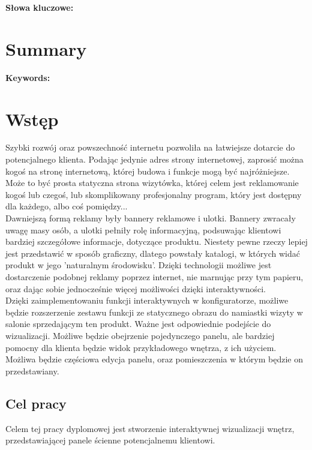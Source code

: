\documentclass{article} %
\begin{document}
\textbf{Słowa kluczowe:}

\section*{Summary}

\textbf{Keywords:}

\newpage

\tableofcontents

\newpage

\section{Wstęp}


Szybki rozwój oraz powszechność internetu pozwoliła na łatwiejsze dotarcie do potencjalnego klienta. Podając jedynie adres strony internetowej, zaprosić można kogoś na stronę internetową, której budowa i funkcje mogą być najróżniejsze. Może to być prosta statyczna strona wizytówka, której celem jest reklamowanie kogoś lub czegoś, lub skomplikowany profesjonalny program, który jest dostępny dla każdego, albo coś pomiędzy...
\\

Dawniejszą formą reklamy były bannery reklamowe i ulotki. Bannery zwracały uwagę masy osób, a ulotki pełniły rolę informacyjną, podsuwając klientowi bardziej szczegółowe informacje, dotyczące produktu. Niestety pewne rzeczy lepiej jest przedstawić w sposób graficzny, dlatego powstały katalogi, w których widać produkt w jego 'naturalnym środowisku'. Dzięki technologii możliwe jest dostarczenie podobnej reklamy poprzez internet, nie marnując przy tym papieru, oraz dając sobie jednocześnie więcej możliwości dzięki interaktywności.
\\

Dzięki zaimplementowaniu funkcji interaktywnych w konfiguratorze, możliwe będzie rozszerzenie zestawu funkcji ze statycznego obrazu do namiastki wizyty w salonie sprzedającym ten produkt. Ważne jest odpowiednie podejście do wizualizacji. Możliwe będzie obejrzenie pojedynczego panelu, ale bardziej pomocny dla klienta będzie widok przykładowego wnętrza, z ich użyciem. Możliwa będzie częściowa edycja panelu, oraz pomieszczenia w którym będzie on przedstawiany.
\\


\subsection{Cel pracy}
Celem tej pracy dyplomowej jest stworzenie interaktywnej wizualizacji wnętrz, przedstawiającej panele ścienne potencjalnemu klientowi. 
\\
\end{document}
